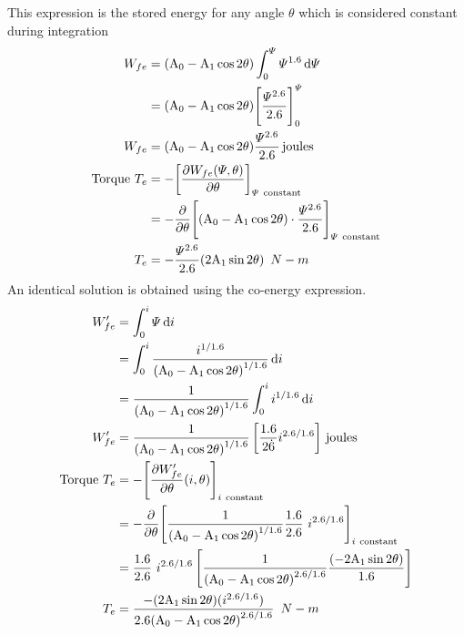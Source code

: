\documentclass[a4paper,numbers=noenddot,12pt]{scrbook}
\begin{document}
This expression is the stored energy for any angle $\theta$ which is considered constant during integration
\begin{align}
    W_{fe} & = (\textup{A}_0 - \textup{A}_1 \cos 2\theta) \int_0^{\varPsi} \varPsi^{1.6} \dif \varPsi \nonumber \\
    & = (\textup{A}_0 - \textup{A}_1 \cos 2\theta) {\left[ \dfrac{\varPsi^{2.6}}{2.6}\right]}_0^{\varPsi} \nonumber \\
    W_{fe} & = (\textup{A}_0 - \textup{A}_1 \cos 2\theta) \dfrac{\varPsi^{2.6}}{2.6} \,\text{joules} \\
    \text{Torque } T_e & = -{\left[\dfrac{\partial W_{fe}(\varPsi, \theta)}{\partial \theta} \right]}_{\varPsi \ \text{constant}} \nonumber \\
    & = - \dfrac{\partial}{\partial \theta} {\left[(\textup{A}_0 - \textup{A}_1 \cos 2 \theta) \cdot \dfrac{\varPsi^{2.6}}{2.6} \right]}_{\varPsi \ \text{constant}} \nonumber \\
    T_e & = - \dfrac{\varPsi^{2.6}}{2.6} (2 \textup{A}_1 \sin 2 \theta)\enspace N - m
    \label{eq:Eq3.34}
\end{align}
An identical solution is obtained using the co-energy expression.
\begin{align}
    W_{fe}' & = \int_0^{i} \varPsi \dif i \nonumber \\
    & = \int_{0}^{i} \dfrac{i^{1 / 1.6}}{{(\textup{A}_0 - \textup{A}_1 \cos 2\theta)}^{1/1.6}} \dif i \nonumber \\
    & = \dfrac{1}{{(\textup{A}_0 - \textup{A}_1 \cos 2\theta)}^{1/1.6}} \int_0^i i^{1/1.6} \dif i \nonumber \\
    W_{fe}' & =\dfrac{1}{{(\textup{A}_0 - \textup{A}_1 \cos 2\theta)}^{1/1.6}} \left[\dfrac{1.6}{2 \dot 6} i^{2.6/1.6} \right] \, \text{joules} \\
    \text{Torque } T_e & = -{\left[\dfrac{\partial W_{fe}'}{\partial \theta}(i,\theta) \right]}_{i \ \text{constant}} \nonumber \\
    & = - \dfrac{\partial}{\partial \theta} {\left[ \dfrac{1}{{(\textup{A}_0 - \textup{A}_1 \cos 2 \theta)}^{1 / 1.6}} \dfrac{1.6}{2.6} \ i^{2.6 / 1.6} \right]}_{i \ \text{constant}} \nonumber \\
    & =\dfrac{1.6}{2.6} \ i^{2.6 / 1.6} \left[ \dfrac{1}{{(\textup{A}_0 - \textup{A}_1 \cos 2 \theta)}^{2.6 / 1.6}} \dfrac{(-2 \textup{A}_1 \sin 2 \theta)}{1.6} \right] \nonumber \\
    T_e & = \dfrac{-(2 \textup{A}_1 \sin 2 \theta)(i^{2.6 / 1.6})}{2.6 {(\textup{A}_0 - \textup{A}_1 \cos 2 \theta)}^{2.6 /1.6}}\enspace N - m
    \label{eq:Eq3.36}
\end{align}
\end{document}
